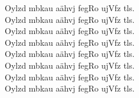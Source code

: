 \documentclass[oneside,openany,headings=optiontotoc,11pt,numbers=noenddot]{scrreprt}
\begin{document}
	\Huge
	Oylzd mbkau aähvj fegRo ujVfz tls.\\
	\vfill
	Oylzd mbkau aähvj fegRo ujVfz tls.\\
	\vfill
	Oylzd mbkau aähvj fegRo ujVfz tls.\\
	\vfill
	Oylzd mbkau aähvj fegRo ujVfz tls.\\
	\vfill
	Oylzd mbkau aähvj fegRo ujVfz tls.\\
	\vfill
	Oylzd mbkau aähvj fegRo ujVfz tls.\\
	\vfill
	Oylzd mbkau aähvj fegRo ujVfz tls.\\
	\vfill
	Oylzd mbkau aähvj fegRo ujVfz tls.\\
\end{document}
